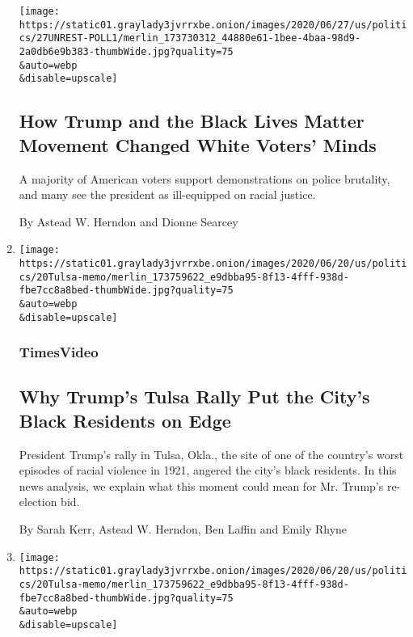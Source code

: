 \begin{enumerate}
  \texttt{[image: https://static01.graylady3jvrrxbe.onion/images/2020/06/27/us/politics/27UNREST-POLL1/merlin\_173730312\_44880e61-1bee-4baa-98d9-2a0db6e9b383-thumbWide.jpg?quality=75\\\&auto=webp\\\&disable=upscale]}

  \hypertarget{how-trump-and-the-black-lives-matter-movement-changed-white-voters-minds}{%
  \subsection{How Trump and the Black Lives Matter Movement Changed
  White Voters'
  Minds}\label{how-trump-and-the-black-lives-matter-movement-changed-white-voters-minds}}

  A majority of American voters support demonstrations on police
  brutality, and many see the president as ill-equipped on racial
  justice.

  By Astead W. Herndon and Dionne Searcey
\item
  \href{/video/us/100000007188759/trump-rally-juneteenth-tulsa-oklahoma.html}{}

  \texttt{[image: https://static01.graylady3jvrrxbe.onion/images/2020/06/20/us/politics/20Tulsa-memo/merlin\_173759622\_e9dbba95-8f13-4fff-938d-fbe7cc8a8bed-thumbWide.jpg?quality=75\\\&auto=webp\\\&disable=upscale]}

  \hypertarget{timesvideo}{%
  \subsubsection{TimesVideo}\label{timesvideo}}

  \hypertarget{why-trumps-tulsa-rally-put-the-citys-black-residents-on-edge}{%
  \subsection{Why Trump's Tulsa Rally Put the City's Black Residents on
  Edge}\label{why-trumps-tulsa-rally-put-the-citys-black-residents-on-edge}}

  President Trump's rally in Tulsa, Okla., the site of one of the
  country's worst episodes of racial violence in 1921, angered the
  city's black residents. In this news analysis, we explain what this
  moment could mean for Mr. Trump's re-election bid.

  By Sarah Kerr, Astead W. Herndon, Ben Laffin and Emily Rhyne
\item
  \href{/2020/06/21/us/politics/trump-rally-supporters.html}{}

  \texttt{[image: https://static01.graylady3jvrrxbe.onion/images/2020/06/20/us/politics/20Tulsa-memo/merlin\_173759622\_e9dbba95-8f13-4fff-938d-fbe7cc8a8bed-thumbWide.jpg?quality=75\\\&auto=webp\\\&disable=upscale]}


\end{enumerate}
